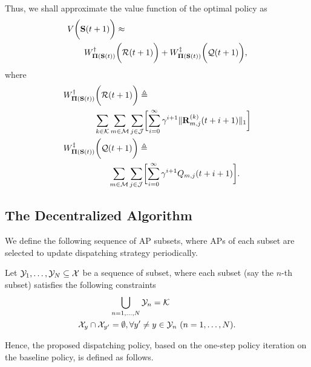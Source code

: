 Thus, we shall approximate the value function of the optimal policy as
\begin{align}
    &V\bigg(\mathbf{S}(t+1)\bigg) \approx
    \nonumber\\
    &~~~~~~W^{\dagger}_{\boldsymbol{\Pi}(\mathbf{S}(t))} \bigg(\mathcal{R}(t+1)\bigg)
    + W^{\ddagger}_{\boldsymbol{\Pi}(\mathbf{S}(t))}\bigg(\mathcal{Q}(t+1)\bigg),
\end{align}
where
\begin{align}
    &W^{\dagger}_{\Baseline(\Stat(t))} \Paren{\mathcal{R}(t+1)} \define
    \nonumber\\
    &~~~~~~~~~~~\sum_{k\in\apSet}\sum_{m\in\esSet}\sum_{j\in\jSpace}\Bracket{
        \sum_{i=0}^{\infty} \gamma^{i+1} \Inorm{\vec{R}^{(k)}_{m,j}(t+i+1)}
    }
    \\    
    &W^{\ddagger}_{\Baseline(\Stat(t))}\Paren{\mathcal{Q}(t+1)} \define
    \nonumber\\
    &~~~~~~~~~~~~~~~~\sum_{m\in\esSet}\sum_{j\in\jSpace}\Bracket{
        \sum_{i=0}^{\infty} \gamma^{i+1} Q_{m,j}(t+i+1)
    }.
\end{align}

\subsection{The Decentralized Algorithm}
\label{subsec:ap_alg}
We define the following sequence of AP subsets, where APs of each subset are selected to update dispatching strategy periodically.
\begin{definition}
    Let $\mathcal{Y}_{1}, \dots, \mathcal{Y}_{N} \subseteq \mathcal{X}$ be a sequence of subset, where each subset (say the $n$-th subset) satisfies the following constraints
    \begin{align}
        &\bigcup_{n=1,\dots,N} \mathcal{Y}_{n} = \mathcal{K}
        \\
        \mathcal{X}_{y} \cap \mathcal{X}_{y'} &=\emptyset, \forall y' \neq y \in \mathcal{Y}_{n}~(n=1,\dots,N).
    \end{align}
\end{definition}

Hence, the proposed dispatching policy, based on the one-step policy iteration on the baseline policy, is defined as follows.

